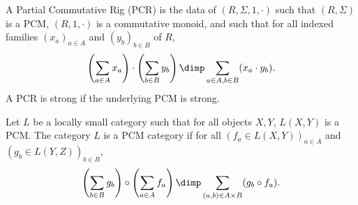 \begin{originaldef}[10]
A Partial Commutative Rig (PCR) is the data of $(R,\Sigma,1,\cdot)$ such that $(R,\Sigma)$ is a PCM, $(R,1,\cdot)$ is a commutative monoid, and such that for all indexed families $(x_a)_{a\in A}$ and $(y_b)_{b\in B}$ of $R$,
\[\left(\sum_{a\in A}x_a\right)\cdot\left(\sum_{b\in B}y_b\right)\dimp\sum_{a\in A,b\in B}(x_a\cdot y_b).\]
A PCR is strong if the underlying PCM is strong.
\end{originaldef}
\begin{originaldef}
Let $L$ be a locally small category such that for all objects $X,Y$, $L(X,Y)$ is a PCM. The category $L$ is a PCM category if for all $(f_a\in L(X,Y))_{a\in A}$ and $(g_b\in L(Y,Z))_{b\in B}$,
\[\left(\sum_{b\in B}g_b\right)\circ\left(\sum_{a\in A}f_a\right)\dimp\sum_{(a,b)\in A\times B}(g_b\circ f_a).\]
\end{originaldef}
